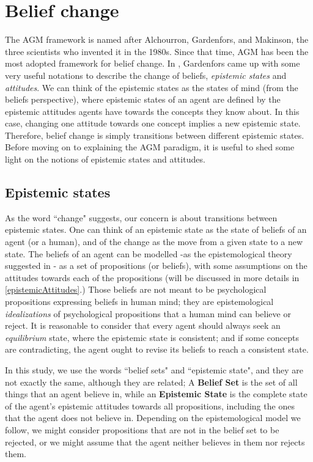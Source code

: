 \documentclass{sfuthesis}
\theoremstyle{plain}
\theoremstyle{definition}
\begin{document}
\section{Belief change}
The AGM framework is named after Alchourron, Gardenfors, and Makinson, the three scientists who invented it in the 1980s. Since that time, AGM has been the most adopted framework for belief change. In \cite{flux}, Gardenfors came up with some very useful notations to describe the change of beliefs, \textit{epistemic states} and \textit{attitudes}. We can think of the epistemic states as the states of mind (from the beliefs perspective), where epistemic states of an agent are defined by the epistemic attitudes agents have towards the concepts they know about. In this case, changing one attitude towards one concept implies a new epistemic state. Therefore, belief change is simply transitions between different epistemic states. Before moving on to explaining the AGM paradigm, it is useful to shed some light on the notions of epistemic states and attitudes.

\subsection{Epistemic states}
As the word ``change" suggests, our concern is about transitions between epistemic states. One can think of an epistemic state as the state of beliefs of an agent (or a human), and of the change as the move from a given state to a new state. The beliefs of an agent can be modelled -as the epistemological theory suggested in \cite{flux}- as a set of propositions (or beliefs), with some assumptions on the attitudes towards each of the propositions (will be discussed in more details in \ref{epistemicAttitudes}.) Those beliefs are not meant to be psychological propositions expressing beliefs in human mind; they are epistemological \textit{idealizations} of psychological propositions that a human mind can believe or reject. It is reasonable to consider that every agent should always seek an \textit{equilibrium} state, where the epistemic state is consistent; and if some concepts are contradicting, the agent ought to revise its beliefs to reach a consistent state. 

In this study, we use the words ``belief sets" and ``epistemic state", and they are not exactly the same, although they are related; A \textbf{Belief Set} is the set of all things that an agent believe in, while an \textbf{Epistemic State} is the complete state of the agent's epistemic attitudes towards all propositions, including the ones that the agent does not believe in. Depending on the epistemological model we follow, we might consider propositions that are not in the belief set to be rejected, or we might assume that the agent neither believes in them nor rejects them. 
\end{document}
